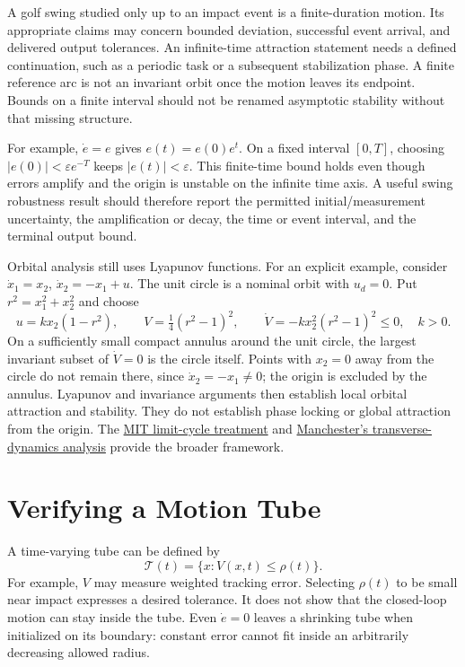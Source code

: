 A golf swing studied only up to an impact event is a finite-duration motion.
Its appropriate claims may concern bounded deviation, successful event arrival,
and delivered output tolerances. An infinite-time attraction statement needs
a defined continuation, such as a periodic task or a subsequent stabilization
phase. A finite reference arc is not an invariant orbit once the motion leaves
its endpoint. Bounds on a finite interval should not be renamed asymptotic
stability without that missing structure.

For example, $\dot e=e$ gives $e(t)=e(0)e^t$. On a fixed interval $[0,T]$,
choosing $|e(0)|<\varepsilon e^{-T}$ keeps $|e(t)|<\varepsilon$. This finite-time
bound holds even though errors amplify and the origin is unstable on the
infinite time axis. A useful swing robustness result should therefore report
the permitted initial/measurement uncertainty, the amplification or decay,
the time or event interval, and the terminal output bound.

Orbital analysis still uses Lyapunov functions. For an explicit example,
consider $\dot x_1=x_2$, $\dot x_2=-x_1+u$. The unit circle is a nominal orbit
with $u_d=0$. Put $r^2=x_1^2+x_2^2$ and choose
\begin{equation}
 u=kx_2(1-r^2),\qquad
 V=\tfrac14(r^2-1)^2,\qquad
 \dot V=-k x_2^2(r^2-1)^2\leq0,
 \quad k>0.
 \label{eq:motion_orbit_example}
\end{equation}
On a sufficiently small compact annulus around the unit circle, the largest
invariant subset of $\dot V=0$ is the circle itself. Points with $x_2=0$ away
from the circle do not remain there, since $\dot x_2=-x_1\ne0$; the origin is
excluded by the annulus. Lyapunov and invariance arguments then establish local
orbital attraction and stability. They do not establish phase locking or global
attraction from the origin. The
\href{https://underactuated.mit.edu/limit_cycles.html}{MIT limit-cycle treatment}
and \href{https://arxiv.org/abs/1010.2241}{Manchester's transverse-dynamics analysis}
provide the broader framework.

\section{Verifying a Motion Tube}

A time-varying tube can be defined by
\begin{equation}
 \mathcal T(t)=\{x:V(x,t)\leq\rho(t)\}.
 \label{eq:motion_tube}
\end{equation}
For example, $V$ may measure weighted tracking error. Selecting $\rho(t)$ to
be small near impact expresses a desired tolerance. It does not show that the
closed-loop motion can stay inside the tube. Even $\dot e=0$ leaves a shrinking
tube when initialized on its boundary: constant error cannot fit inside an
arbitrarily decreasing allowed radius.


